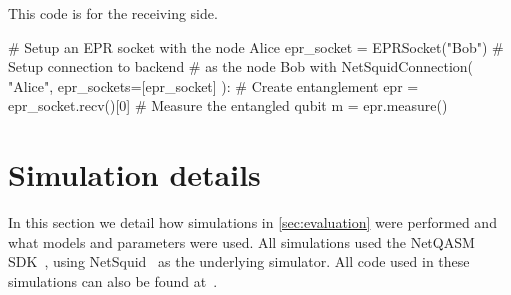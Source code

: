 This code is for the receiving side.
\begin{pycode}
# Setup an EPR socket with the node Alice
epr_socket = EPRSocket("Bob")
# Setup connection to backend
# as the node Bob
with NetSquidConnection(
"Alice",
epr_sockets=[epr_socket]
):
  # Create entanglement
  epr = epr_socket.recv()[0]
  # Measure the entangled qubit
  m = epr.measure()
\end{pycode}

\section{Simulation details}
\label{app:simulation}

In this section we detail how simulations in \cref{sec:evaluation} were
performed and what models and parameters were used. All simulations used the
\ac{NetQASM} SDK~\cite{git_netqasm}, using
NetSquid~\cite{netsquid,coopmans2021netsquid} as the underlying simulator. All
code used in these simulations can also be found at~\cite{git_squidasm}.



